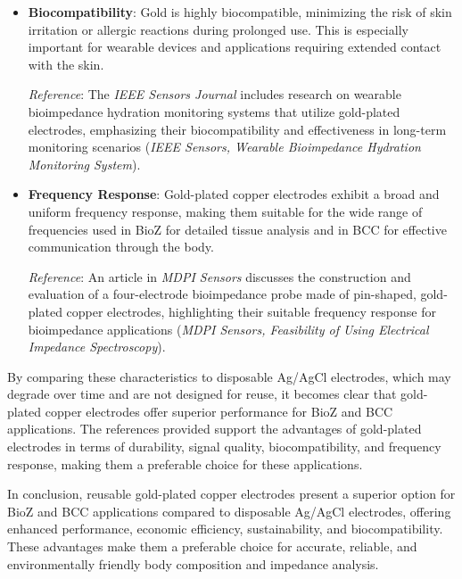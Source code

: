 {\begin{enumerate}
\begin{itemize}
    \textit{Reference}: A study published in \textit{Nature Scientific Reports} demonstrates the use of gold-plated electrodes for high-quality electrophysiological measurements, noting their enhanced signal stability and reduced noise compared to other materials (\textit{Nature Scientific Reports, Gold-Plated Electrode with High Scratch Strength}, https://www.nature.com/articles/s41598-019-39138-w).
    
    \item \textbf{Biocompatibility}: Gold is highly biocompatible, minimizing the risk of skin irritation or allergic reactions during prolonged use. This is especially important for wearable devices and applications requiring extended contact with the skin.
    
    \textit{Reference}: The \textit{IEEE Sensors Journal} includes research on wearable bioimpedance hydration monitoring systems that utilize gold-plated electrodes, emphasizing their biocompatibility and effectiveness in long-term monitoring scenarios (\textit{IEEE Sensors, Wearable Bioimpedance Hydration Monitoring System}).
    
    \item \textbf{Frequency Response}: Gold-plated copper electrodes exhibit a broad and uniform frequency response, making them suitable for the wide range of frequencies used in BioZ for detailed tissue analysis and in BCC for effective communication through the body.
    
    \textit{Reference}: An article in \textit{MDPI Sensors} discusses the construction and evaluation of a four-electrode bioimpedance probe made of pin-shaped, gold-plated copper electrodes, highlighting their suitable frequency response for bioimpedance applications (\textit{MDPI Sensors, Feasibility of Using Electrical Impedance Spectroscopy}).
\end{itemize}

By comparing these characteristics to disposable Ag/AgCl electrodes, which may degrade over time and are not designed for reuse, it becomes clear that gold-plated copper electrodes offer superior performance for BioZ and BCC applications. The references provided support the advantages of gold-plated electrodes in terms of durability, signal quality, biocompatibility, and frequency response, making them a preferable choice for these applications.

    
\end{enumerate}

In conclusion, reusable gold-plated copper electrodes present a superior option for BioZ and BCC applications compared to disposable Ag/AgCl electrodes, offering enhanced performance, economic efficiency, sustainability, and biocompatibility. These advantages make them a preferable choice for accurate, reliable, and environmentally friendly body composition and impedance analysis.


}


